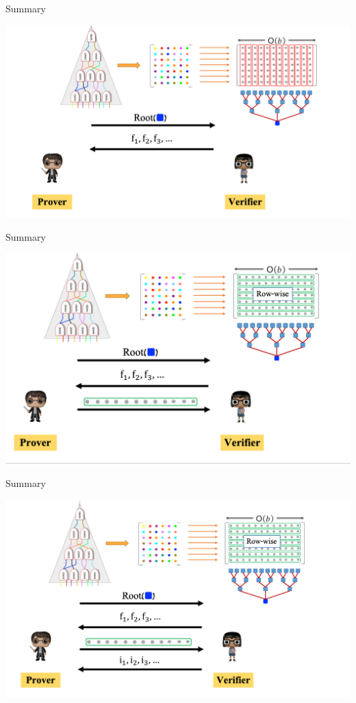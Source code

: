 \documentclass{beamer}
\begin{document}
\begin{frame}{Summary}
	\begin{minipage}{0.42\linewidth}
		\includegraphics[scale=0.26]{l6.png}
	\end{minipage}
\end{frame}

\begin{frame}{Summary}
	\begin{minipage}{0.42\linewidth}
		\includegraphics[scale=0.26]{l7.png}
	\end{minipage}
\end{frame}

\begin{frame}{Summary}
	\begin{minipage}{0.42\linewidth}
		\includegraphics[scale=0.26]{l8.png}
	\end{minipage}
\end{frame}
\end{document}
